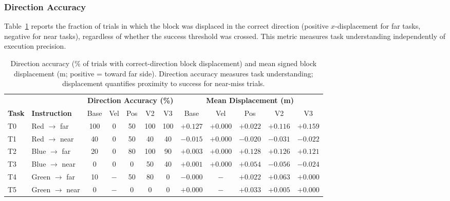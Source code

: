 \documentclass[conference, 12pt]{IEEEtran}
\begin{document}
\subsubsection{Direction Accuracy}

Table~\ref{tab:direction} reports the fraction of trials in which the block was
displaced in the correct direction (positive $x$-displacement for far tasks,
negative for near tasks), regardless of whether the success threshold was crossed.
This metric measures task understanding independently of execution precision.

\begin{table}[t]
\centering
\caption{Direction accuracy (\% of trials with correct-direction block displacement)
and mean signed block displacement (m; positive = toward far side).
Direction accuracy measures task understanding; displacement quantifies
proximity to success for near-miss trials.}
\label{tab:direction}
\setlength{\tabcolsep}{4.5pt}
\small
\begin{tabular}{@{}llcccccccccc@{}}
\toprule
& & \multicolumn{5}{c}{\textbf{Direction Accuracy (\%)}} &
    \multicolumn{5}{c}{\textbf{Mean Displacement (m)}} \\
\cmidrule(lr){3-7}\cmidrule(lr){8-12}
\textbf{Task} & \textbf{Instruction} &
    Base & Vel & Pos & V2 & V3 &
    Base & Vel & Pos & V2 & V3 \\
\midrule
T0 & Red $\to$ far   & 100 & 0  & 50  & 100 & 100 & $+0.127$ & $+0.000$ & $+0.022$ & $+0.116$ & $+0.159$ \\
T1 & Red $\to$ near  & 40  & 0  & 50  & 40  & 40  & $-0.015$ & $+0.000$ & $-0.020$ & $-0.031$ & $-0.022$ \\
T2 & Blue $\to$ far  & 20  & 0  & 80  & 100 & 90  & $+0.003$ & $+0.000$ & $+0.128$ & $+0.126$ & $+0.121$ \\
T3 & Blue $\to$ near & 0   & 0  & 0   & 50  & 40  & $+0.001$ & $+0.000$ & $+0.054$ & $-0.056$ & $-0.024$ \\
T4 & Green $\to$ far & 10  & $-$& 50  & 80  & 0   & $-0.000$ & $-$      & $+0.022$ & $+0.063$ & $+0.000$ \\
T5 & Green $\to$ near& 0   & $-$& 0   & 0   & 0   & $+0.000$ & $-$      & $+0.033$ & $+0.005$ & $+0.000$ \\
\bottomrule
\end{tabular}
\end{table}
\end{document}
